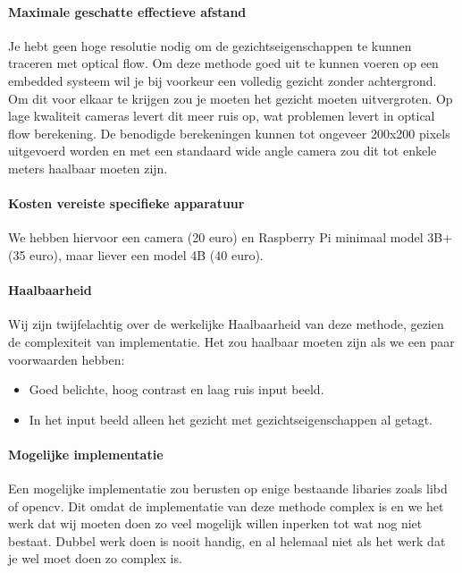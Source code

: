 \documentclass[11pt]{article}
\begin{document}
    \paragraph{Maximale geschatte effectieve afstand}
    Je hebt geen hoge resolutie nodig om de gezichtseigenschappen te kunnen traceren met optical flow.
    Om deze methode goed uit te kunnen voeren op een embedded systeem wil je bij voorkeur een volledig gezicht zonder achtergrond.
    Om dit voor elkaar te krijgen zou je moeten het gezicht moeten uitvergroten.
    Op lage kwaliteit cameras levert dit meer ruis op, wat problemen levert in optical flow berekening.
    De benodigde berekeningen kunnen tot ongeveer 200x200 pixels uitgevoerd worden en met een standaard wide angle camera zou dit tot enkele meters haalbaar moeten zijn.

    \paragraph{Kosten vereiste specifieke apparatuur}
    We hebben hiervoor een camera (20 euro) en Raspberry Pi minimaal model 3B+ (35 euro), maar liever een model 4B (40 euro).

    \paragraph{Haalbaarheid}
    Wij zijn twijfelachtig over de werkelijke Haalbaarheid van deze methode, gezien de complexiteit van implementatie.
    Het zou haalbaar moeten zijn als we een paar voorwaarden hebben:
    \begin{itemize}
        \item Goed belichte, hoog contrast en laag ruis input beeld.
        \item In het input beeld alleen het gezicht met gezichtseigenschappen al getagt.
    \end{itemize}

    \paragraph{Mogelijke implementatie}
    Een mogelijke implementatie zou berusten op enige bestaande libaries zoals libd of opencv.
    Dit omdat de implementatie van deze methode complex is en we het werk dat wij moeten doen zo veel mogelijk willen inperken tot wat nog niet bestaat.
    Dubbel werk doen is nooit handig, en al helemaal niet als het werk dat je wel moet doen zo complex is.


    
\end{document}
